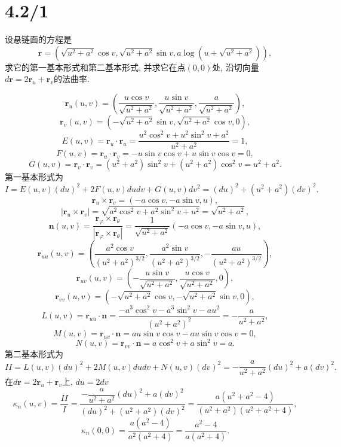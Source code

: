 \documentclass[11pt,a4paper]{article}
\author{刘逸灏 (515370910207)}
\begin{document}
\maketitle

\section{4.2/1}

\begin{problem}
  设悬链面的方程是
  $$\mathbf{r}=\left(\sqrt{u^2+a^2}\cos v,\sqrt{u^2+a^2}\sin v,a\log(u+\sqrt{u^2+a^2})\right),$$
  求它的第一基本形式和第二基本形式, 并求它在点$(0,0)$处, 沿切向量$d\mathbf{r}=2\mathbf{r}_u+\mathbf{r}_v$的法曲率.
\end{problem}

$$\mathbf{r}_u(u,v)=\left(\frac{u \cos v}{\sqrt{u^2+a^2}},\frac{u \sin v}{\sqrt{u^2+a^2}},\frac{a}{\sqrt{u^2+a^2}}\right),$$
$$\mathbf{r}_v(u,v)=\left(-\sqrt{u^2+a^2}\sin v,\sqrt{u^2+a^2}\cos v,0\right),$$
$$E(u,v)=\mathbf{r}_u\cdot \mathbf{r}_u=\frac{u^2\cos^2v+u^2\sin^2v+a^2}{u^2+a^2}=1,$$
$$F(u,v)=\mathbf{r}_u\cdot \mathbf{r}_v=-u\sin v\cos v+u\sin v\cos v=0,$$
$$G(u,v)=\mathbf{r}_v\cdot \mathbf{r}_v=(u^2+a^2)\sin^2v+(u^2+a^2)\cos^2v=u^2+a^2.$$
第一基本形式为
$$I=E(u,v)(du)^2+2F(u,v)dudv+G(u,v)dv^2=(du)^2+(u^2+a^2)(dv)^2.$$
$$\mathbf{r}_u\times\mathbf{r}_v=(-a\cos v,-a\sin v,u),$$
$$|\mathbf{r}_u\times\mathbf{r}_v|=\sqrt{a^2\cos^2 v+a^2\sin^2 v+u^2}=\sqrt{u^2+a^2},$$
$$\mathbf{n}(u,v)=\frac{\mathbf{r}_\varphi\times\mathbf{r}_\theta}{|\mathbf{r}_\varphi\times\mathbf{r}_\theta|}=\frac{1}{\sqrt{u^2+a^2}}(-a\cos v,-a\sin v,u),$$
$$\mathbf{r}_{uu}(u,v)=\left(\frac{a^2 \cos v}{\left(u^2+a^2\right)^{3/2}},\frac{a^2 \sin v}{\left(u^2+a^2\right)^{3/2}},-\frac{a u}{\left(u^2+a^2\right)^{3/2}}\right),$$
$$\mathbf{r}_{uv}(u,v)=\left(-\frac{u\sin v}{\sqrt{u^2+a^2}},\frac{u\cos v}{\sqrt{u^2+a^2}},0\right),$$
$$\mathbf{r}_{vv}(u,v)=\left(-\sqrt{u^2+a^2}\cos v,-\sqrt{u^2+a^2}\sin v,0\right),$$
$$L(u,v)=\mathbf{r}_{uu}\cdot\mathbf{n}=\frac{-a^3\cos^2v-a^3\sin^2v-au^2}{(u^2+a^2)^2}=-\frac{a}{u^2+a^2},$$
$$M(u,v)=\mathbf{r}_{uv}\cdot\mathbf{n}=au\sin v\cos v-au\sin v\cos v=0,$$
$$N(u,v)=\mathbf{r}_{vv}\cdot\mathbf{n}=a\cos^2v+a\sin^2v=a.$$
第二基本形式为
$$II=L(u,v)(du)^2+2M(u,v)dudv+N(u,v)(dv)^2=-\frac{a}{u^2+a^2}(du)^2+a(dv)^2.$$
在$d\mathbf{r}=2\mathbf{r}_u+\mathbf{r}_v$上, $du=2dv$
$$\kappa_n(u,v)=\frac{II}{I}=\frac{-\dfrac{a}{u^2+a^2}(du)^2+a(dv)^2}{(du)^2+(u^2+a^2)(dv)^2}=\frac{a(u^2+a^2-4)}{(u^2+a^2)(u^2+a^2+4)},$$
$$\kappa_n(0,0)=\frac{a(a^2-4)}{a^2(a^2+4)}=\frac{a^2-4}{a(a^2+4)}.$$
\end{document}

